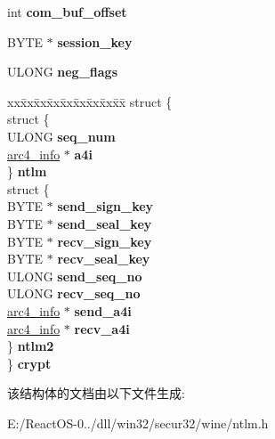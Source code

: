 \begin{DoxyCompactItemize}
int {\bfseries com\+\_\+buf\+\_\+offset}
\item 
\mbox{\label{struct___nego_helper_a502a506c1832f4cce454ce839b5a6068}} 
B\+Y\+TE $\ast$ {\bfseries session\+\_\+key}
\item 
\mbox{\label{struct___nego_helper_a9fe8bd5d5faf196f7462054f3cf8ed3c}} 
U\+L\+O\+NG {\bfseries neg\+\_\+flags}
\item 
\mbox{\label{struct___nego_helper_a6778cc27f7d77c4617531fb27a3e9edb}} 
\begin{tabbing}
xx\=xx\=xx\=xx\=xx\=xx\=xx\=xx\=xx\=\kill
struct \{\\
\>struct \{\\
\>\>ULONG {\bfseries seq\_num}\\
\>\>\hyperlink{structtag__arc4__info}{arc4\_info} $\ast$ {\bfseries a4i}\\
\>\} {\bfseries ntlm}\\
\>struct \{\\
\>\>BYTE $\ast$ {\bfseries send\_sign\_key}\\
\>\>BYTE $\ast$ {\bfseries send\_seal\_key}\\
\>\>BYTE $\ast$ {\bfseries recv\_sign\_key}\\
\>\>BYTE $\ast$ {\bfseries recv\_seal\_key}\\
\>\>ULONG {\bfseries send\_seq\_no}\\
\>\>ULONG {\bfseries recv\_seq\_no}\\
\>\>\hyperlink{structtag__arc4__info}{arc4\_info} $\ast$ {\bfseries send\_a4i}\\
\>\>\hyperlink{structtag__arc4__info}{arc4\_info} $\ast$ {\bfseries recv\_a4i}\\
\>\} {\bfseries ntlm2}\\
\} {\bfseries crypt}\\

\end{tabbing}\end{DoxyCompactItemize}


该结构体的文档由以下文件生成\+:\begin{DoxyCompactItemize}
\item 
E\+:/\+React\+O\+S-\/0../dll/win32/secur32/wine/ntlm.\+h\end{DoxyCompactItemize}
